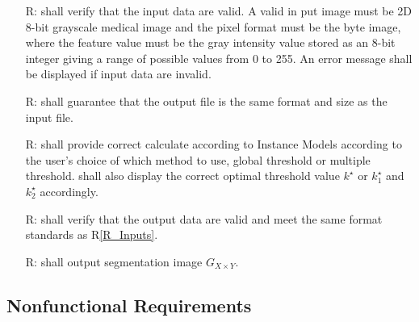 \documentclass[12pt]{article}
\newcounter{reqnum} %
\newcommand{\rref}[1]{R\ref{#1}}
\begin{document}
\noindent \begin{itemize}

\item[R\refstepcounter{reqnum}\thereqnum \label{R_Inputs}:] 
\famname{} shall verify that the input data are valid. A valid in put image must be 2D 8-bit grayscale medical image and the pixel format must be the byte image, where the feature value must be the gray intensity value stored as an 8-bit integer giving a range of possible values from 0 to 255. An error message shall be displayed if input data are invalid.

\item[R\refstepcounter{reqnum}\thereqnum \label{R_OutputInputs}:] 
\famname{} shall guarantee that the output file is the same format and size as the input file.

\item[R\refstepcounter{reqnum}\thereqnum \label{R_Calculate}:]
\famname{} shall provide correct calculate according to Instance Models according to the user's choice of which method to use, global threshold or multiple threshold. \famname{} shall also display the correct optimal threshold value $k^{\star}$ or $k^{\star}_{1}$ and $k^{\star}_{2}$ accordingly. 

\item[R\refstepcounter{reqnum}\thereqnum \label{R_VerifyOutput}:]
\famname{} shall verify that the output data are valid and meet the same format standards as \rref{R_Inputs}. 

\item[R\refstepcounter{reqnum}\thereqnum \label{R_Outputk}:] 
\famname{} shall output segmentation image $G_{X \times Y}$.

\end{itemize}

\subsection{Nonfunctional Requirements}
\end{document}
